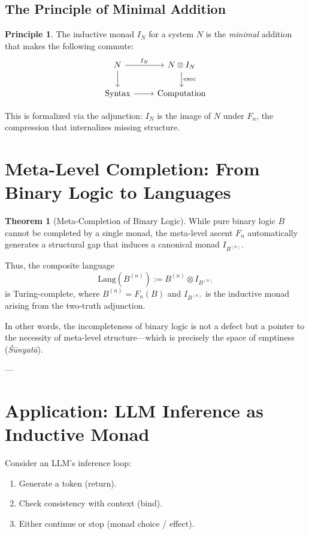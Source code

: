 \documentclass[a4paper,11pt]{article}
\theoremstyle{definition}
\newtheorem{theorem}{Theorem}[section]
\newtheorem{principle}{Principle}[section]
\begin{document}
\subsection{The Principle of Minimal Addition}

\begin{principle}
The inductive monad $I_N$ for a system $N$ is the \emph{minimal} addition that makes the following commute:
\[
\begin{tikzcd}
N \arrow[r, "I_N"] \arrow[d] & N \otimes I_N \arrow[d, "\text{exec}"] \\
\text{Syntax} \arrow[r] & \text{Computation}
\end{tikzcd}
\]
\end{principle}

This is formalized via the adjunction: $I_N$ is the image of $N$ under $F_n$, the compression that internalizes missing structure.

\section{Meta-Level Completion: From Binary Logic to Languages}

\begin{theorem}[Meta-Completion of Binary Logic]
While pure binary logic $B$ cannot be completed by a single monad, the meta-level ascent $F_n$ automatically generates a structural gap that induces a canonical monad $I_{B^{(n)}}$.

Thus, the composite language
\[
  \text{Lang}(B^{(n)}) := B^{(n)} \otimes I_{B^{(n)}}
\]
is Turing-complete, where $B^{(n)} = F_n(B)$ and $I_{B^{(n)}}$ is the inductive monad arising from the two-truth adjunction.

In other words, the incompleteness of binary logic is not a defect but a pointer to the necessity of meta-level structure---which is precisely the space of emptiness (\emph{Śūnyatā}).
\end{theorem}

---

\section{Application: LLM Inference as Inductive Monad}

Consider an LLM's inference loop:

\begin{enumerate}
  \item Generate a token (return).
  \item Check consistency with context (bind).
  \item Either continue or stop (monad choice / effect).
\end{enumerate}
\end{document}
